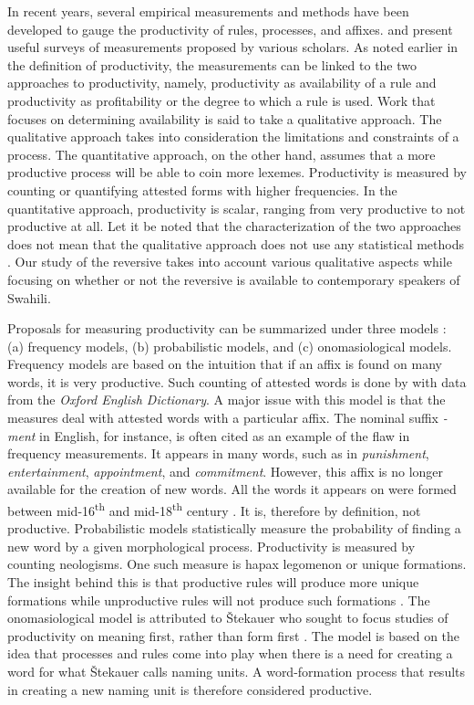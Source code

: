 \documentclass[output=paper]{langsci/langscibook}
\begin{document}
In recent years, several empirical measurements and methods have been developed to gauge the productivity of rules, processes, and affixes. \citet[143-161]{Bauer2001} and \citet{Fernandez-Dominguezetal2007} present useful surveys of measurements proposed by various scholars. As noted earlier in the definition of productivity, the measurements can be linked to the two approaches to productivity, namely, productivity as availability of a rule and productivity as profitability or the degree to which a rule is used. Work that focuses on determining availability is said to take a qualitative approach. The qualitative approach  takes into consideration the limitations and constraints of a process. The quantitative approach, on the other hand, assumes that a more productive process will be able to coin more lexemes. Productivity is measured by counting or quantifying attested forms with higher frequencies. In the quantitative approach, productivity is scalar, ranging from very productive to not productive at all. Let it be noted that the characterization of the two approaches does not mean that the qualitative approach does not use any statistical methods \citep[434-437]{Fernandez-Dominguez2013}. Our study of the reversive takes into account various qualitative aspects while focusing on whether or not the reversive is available to contemporary speakers of Swahili. 

Proposals for measuring productivity can be summarized under three models \citep[35]{Fernandez-Dominguezetal2007}: 
(a) frequency models, 
(b) probabilistic models, and 
(c) onomasiological models. Frequency models are based on the intuition that if an affix is found on many words, it is very productive. Such counting of attested words is done by \citet{Plag1999} with data from the \textit{Oxford English Dictionary}. A major issue with this model is that the measures deal with attested words with a particular affix. The nominal suffix \textit{-ment} in English, for instance, is often cited as an example of the flaw in frequency measurements. It appears in many words, such as in \textit{punishment}, \textit{entertainment}, \textit{appointment}, and \textit{commitment}. However, this affix is no longer available for the creation of new words. All the words it appears on were formed between mid-16\textsuperscript{th} and mid-18\textsuperscript{th} century \citep[181]{Bauer2001}. It is, therefore by definition, not productive. Probabilistic models statistically measure the probability of finding a new word by a given morphological process. Productivity is measured by counting neologisms. One such measure is hapax legomenon or unique formations. The insight behind this is that productive rules will produce more unique formations while unproductive rules will not produce such formations \citep{Baayen1992}. The onomasiological model is attributed to \v{S}tekauer who sought to focus studies of productivity on meaning first, rather than form first \citep{Stekauer2005}. The model is based on the idea that processes and rules come into play when there is a need for creating a word  for what \v{S}tekauer calls naming units. A word-formation process that results in creating a new naming unit is therefore considered productive. 
\end{document}
